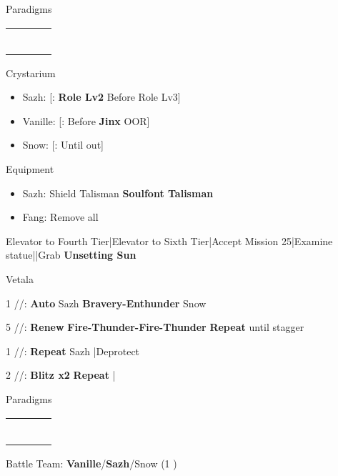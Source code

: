 \begin{menu}
	\item Paradigms
	\begin{tabular}{cccl}
		\syn          & \sab & \rav          &  \\
		\com          & \med & \com          &          \\
		\syn          & \med & \com          &          \\
		\com          & \sab & \com          &          \\
		\chrole{\rav} & \sab & \chrole{\rav} &          \\
		\com          & \rav & \com          &
	\end{tabular}
	\item Crystarium
	\begin{itemize}
		\item Sazh: [\rav: \textbf{Role Lv2} \to Before Role Lv3]
		\item Vanille: [\sab: Before \textbf{Jinx} OOR]
		\item Snow: [\sen: Until out]
	\end{itemize}
	\item Equipment
	\begin{itemize}
		\item Sazh: Shield Talisman \to \textbf{Soulfont Talisman}
		\item Fang: Remove all
	\end{itemize}
\end{menu}
\begin{mainlist}
	\item Elevator to Fourth Tier|Elevator to Sixth Tier|Accept Mission 25|Examine statue|\skip|Grab \textbf{Unsetting Sun}
\end{mainlist}
\begin{fight}{Vetala}
	\item [1] \syn/\sab/\rav: \textbf{Auto} Sazh \to \textbf{Bravery-Enthunder} Snow
	\item [5] \rav/\sab/\rav: \textbf{Renew} \to \textbf{Fire-Thunder-Fire-Thunder} \to \textbf{Repeat} until stagger
	\item [1] \syn/\sab/\rav: \textbf{Repeat} Sazh |Deprotect
	\item [2] \com/\med/\com: \textbf{Blitz x2} \to \textbf{Repeat} |\skip
\end{fight}
\begin{menu}
	\item Paradigms
	\begin{tabular}{cccl}
		\syn          & \chrole{\rav} & \chrole{\sen} &          \\
		\com          & \chrole{\rav} & \chrole{\rav} &          \\
		\chrole{\rav} & \chrole{\rav} & \chrole{\sen} &          \\
		\com          & \chrole{\rav} & \com          &  \\
		\rav          & \sab          & \chrole{\sen} &          \\
		\com          & \rav          & \com          &
	\end{tabular}
	\item Battle Team: \textbf{Vanille}/\textbf{Sazh}/Snow (1 )
\end{menu}
